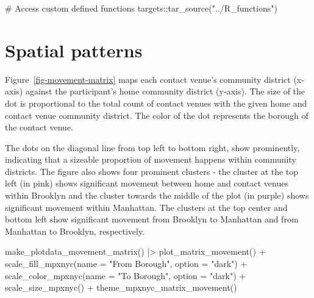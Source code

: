 \documentclass[
  letterpaper,
  DIV=11,
  numbers=noendperiod,
  oneside]{scrreprt}
\newenvironment{Shaded}{\begin{snugshade}}{\end{snugshade}}
\newcommand{\AttributeTok}[1]{\textcolor[rgb]{0.40,0.45,0.13}{#1}}
\newcommand{\CommentTok}[1]{\textcolor[rgb]{0.37,0.37,0.37}{#1}}
\newcommand{\FunctionTok}[1]{\textcolor[rgb]{0.28,0.35,0.67}{#1}}
\newcommand{\NormalTok}[1]{\textcolor[rgb]{0.00,0.23,0.31}{#1}}
\newcommand{\SpecialCharTok}[1]{\textcolor[rgb]{0.37,0.37,0.37}{#1}}
\newcommand{\StringTok}[1]{\textcolor[rgb]{0.13,0.47,0.30}{#1}}
\begin{document}
\begin{Shaded}
\begin{Highlighting}[]
\CommentTok{\# Access custom defined functions}
\NormalTok{targets}\SpecialCharTok{::}\FunctionTok{tar\_source}\NormalTok{(}\StringTok{"../R\_functions"}\NormalTok{)}
\end{Highlighting}
\end{Shaded}

\hypertarget{spatial-patterns}{%
\section{Spatial patterns}\label{spatial-patterns}}

Figure~\ref{fig-movement-matrix} maps each contact venue's community
district (x-axis) against the participant's home community district
(y-axis). The size of the dot is proportional to the total count of
contact venues with the given home and contact venue community district.
The color of the dot represents the borough of the contact venue.

The dots on the diagonal line from top left to bottom right, show
prominently, indicating that a sizeable proportion of movement happens
within community districts. The figure also shows four prominent
clusters - the cluster at the top left (in pink) shows significant
movement between home and contact venues within Brooklyn and the cluster
towards the middle of the plot (in purple) shows significant movement
within Manhattan. The clusters at the top center and bottom left show
significant movement from Brooklyn to Manhattan and from Manhattan to
Brooklyn, respectively.

\begin{Shaded}
\begin{Highlighting}[]
\FunctionTok{make\_plotdata\_movement\_matrix}\NormalTok{() }\SpecialCharTok{|\textgreater{}}
  \FunctionTok{plot\_matrix\_movement}\NormalTok{() }\SpecialCharTok{+}
  \FunctionTok{scale\_fill\_mpxnyc}\NormalTok{(}\AttributeTok{name =} \StringTok{"From Borough"}\NormalTok{, }\AttributeTok{option =} \StringTok{"dark"}\NormalTok{) }\SpecialCharTok{+}
  \FunctionTok{scale\_color\_mpxnyc}\NormalTok{(}\AttributeTok{name =} \StringTok{"To Borough"}\NormalTok{, }\AttributeTok{option =} \StringTok{"dark"}\NormalTok{) }\SpecialCharTok{+}
  \FunctionTok{scale\_size\_mpxnyc}\NormalTok{() }\SpecialCharTok{+}
  \FunctionTok{theme\_mpxnyc\_matrix\_movement}\NormalTok{() }
\end{Highlighting}
\end{Shaded}
\end{document}
